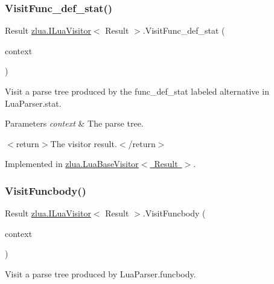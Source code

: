 \subsubsection{\texorpdfstring{Visit\+Func\+\_\+def\+\_\+stat()}{VisitFunc\_def\_stat()}}
{\footnotesize\ttfamily Result \mbox{\hyperlink{interfacezlua_1_1_i_lua_visitor}{zlua.\+I\+Lua\+Visitor}}$<$ Result $>$.Visit\+Func\+\_\+def\+\_\+stat (\begin{DoxyParamCaption}\item[{\mbox{[}\+Not\+Null\mbox{]} \mbox{\hyperlink{classzlua_1_1_lua_parser_1_1_func__def__stat_context}{Lua\+Parser.\+Func\+\_\+def\+\_\+stat\+Context}}}]{context }\end{DoxyParamCaption})}



Visit a parse tree produced by the {\ttfamily func\+\_\+def\+\_\+stat} labeled alternative in Lua\+Parser.\+stat. 


\begin{DoxyParams}{Parameters}
{\em context} & The parse tree.\\
\hline
\end{DoxyParams}
$<$return$>$The visitor result.$<$/return$>$ 

Implemented in \mbox{\hyperlink{classzlua_1_1_lua_base_visitor_ac9505bda82c85093117ee5931e73f59c}{zlua.\+Lua\+Base\+Visitor$<$ Result $>$}}.

\mbox{\label{interfacezlua_1_1_i_lua_visitor_a4362832ba6c73a073512b353b87560d4}} 
\subsubsection{\texorpdfstring{Visit\+Funcbody()}{VisitFuncbody()}}
{\footnotesize\ttfamily Result \mbox{\hyperlink{interfacezlua_1_1_i_lua_visitor}{zlua.\+I\+Lua\+Visitor}}$<$ Result $>$.Visit\+Funcbody (\begin{DoxyParamCaption}\item[{\mbox{[}\+Not\+Null\mbox{]} \mbox{\hyperlink{classzlua_1_1_lua_parser_1_1_funcbody_context}{Lua\+Parser.\+Funcbody\+Context}}}]{context }\end{DoxyParamCaption})}



Visit a parse tree produced by Lua\+Parser.\+funcbody. 


